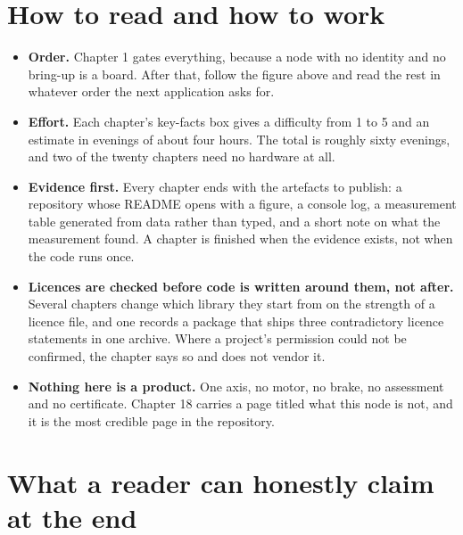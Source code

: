 \section*{How to read and how to work}


\begin{itemize}
\item \textbf{Order.} Chapter 1 gates everything, because a node with no
identity and no bring-up is a board. After that, follow the figure above and
read the rest in whatever order the next application asks for.
\item \textbf{Effort.} Each chapter's key-facts box gives a difficulty from 1 to
5 and an estimate in evenings of about four hours. The total is roughly sixty
evenings, and two of the twenty chapters need no hardware at all.
\item \textbf{Evidence first.} Every chapter ends with the artefacts to publish:
a repository whose README opens with a figure, a console log, a measurement
table generated from data rather than typed, and a short note on what the
measurement found. A chapter is finished when the evidence exists, not when the
code runs once.
\item \textbf{Licences are checked before code is written around them, not
after.} Several chapters change which library they start from on the strength of
a licence file, and one records a package that ships three contradictory licence
statements in one archive. Where a project's permission could not be confirmed,
the chapter says so and does not vendor it.
\item \textbf{Nothing here is a product.} One axis, no motor, no brake, no
assessment and no certificate. Chapter 18 carries a page titled what this node
is not, and it is the most credible page in the repository.
\end{itemize}

\section*{What a reader can honestly claim at the end}


